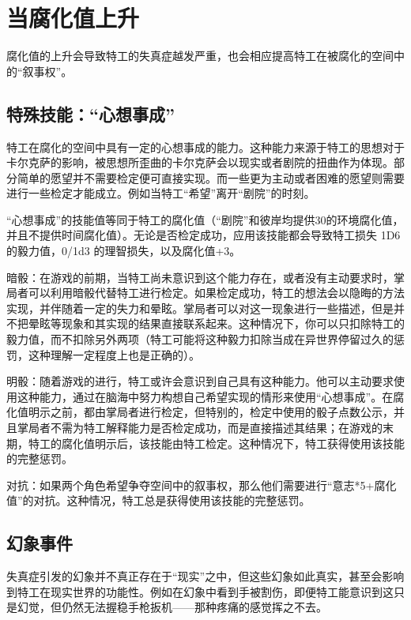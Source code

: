 \chapter{当腐化值上升}

腐化值的上升会导致特工的失真症越发严重，也会相应提高特工在被腐化的空间中的“叙事权”。

\section{特殊技能：“心想事成”}

特工在腐化的空间中具有一定的心想事成的能力。这种能力来源于特工的思想对于卡尔克萨的影响，被思想所歪曲的卡尔克萨会以现实或者剧院的扭曲作为体现。部分简单的愿望并不需要检定便可直接实现。而一些更为主动或者困难的愿望则需要进行一些检定才能成立。例如当特工“希望”离开“剧院”的时刻。

“心想事成”的技能值等同于特工的腐化值（“剧院”和彼岸均提供30的环境腐化值，并且不提供时间腐化值）。无论是否检定成功，应用该技能都会导致特工损失 1D6 的毅力值，0/1d3 的理智损失，以及腐化值+3。

暗骰：在游戏的前期，当特工尚未意识到这个能力存在，或者没有主动要求时，掌局者可以利用暗骰代替特工进行检定。如果检定成功，特工的想法会以隐晦的方法实现，并伴随着一定的失力和晕眩。掌局者可以对这一现象进行一些描述，但是并不把晕眩等现象和其实现的结果直接联系起来。这种情况下，你可以只扣除特工的毅力值，而不扣除另外两项（特工可能将这种毅力扣除当成在异世界停留过久的惩罚，这种理解一定程度上也是正确的）。

明骰：随着游戏的进行，特工或许会意识到自己具有这种能力。他可以主动要求使用这种能力，通过在脑海中努力构想自己希望实现的情形来使用“心想事成”。在腐化值明示之前，都由掌局者进行检定，但特别的，检定中使用的骰子点数公示，并且掌局者不需为特工解释能力是否检定成功，而是直接描述其结果；在游戏的末期，特工的腐化值明示后，该技能由特工检定。这种情况下，特工获得使用该技能的完整惩罚。

对抗：如果两个角色希望争夺空间中的叙事权，那么他们需要进行“意志*5+腐化值”的对抗。这种情况，特工总是获得使用该技能的完整惩罚。

\section{幻象事件}

失真症引发的幻象并不真正存在于“现实”之中，但这些幻象如此真实，甚至会影响到特工在现实世界的功能性。例如在幻象中看到手被割伤，即便特工能意识到这只是幻觉，但仍然无法握稳手枪扳机——那种疼痛的感觉挥之不去。

